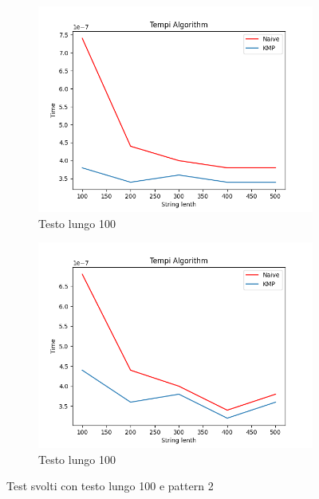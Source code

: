 \begin{figure}[H]
    \centering
    \begin{subfigure}[b]{0.49\textwidth}
        \centering
        \includegraphics[width=\textwidth]{Resources/lenght100_2.png}
        \caption{Testo lungo 100}
        \label{fig:lenght100_1}
    \end{subfigure}
    \hfill
    \begin{subfigure}[b]{0.49\textwidth}
        \centering
        \includegraphics[width=\textwidth]{Resources/lenght100_3.png}
        \caption{Testo lungo 100}
        \label{fig:lenght100_2}
    \end{subfigure}
    \caption{Test svolti con testo lungo 100 e pattern 2}
    \label{fig:test_100}
\end{figure}

